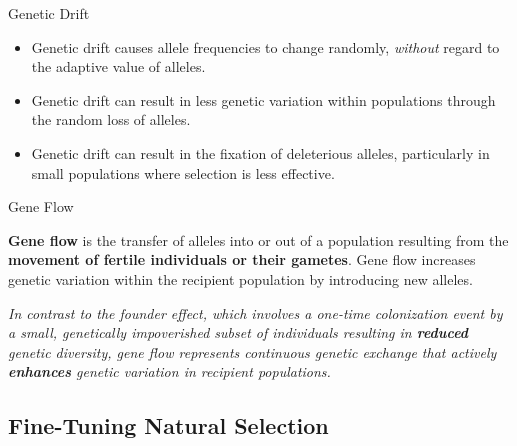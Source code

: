 \documentclass[10pt]{article}
\begin{document}
\begin{core}{Genetic Drift}
\begin{itemize}
        \item Genetic drift causes allele frequencies to change randomly, \textit{without} regard to the adaptive value of alleles.

        \item Genetic drift can result in less genetic variation within populations through the random loss of alleles.

        \item Genetic drift can result in the fixation of deleterious alleles, particularly in small populations where selection is less effective.

      \end{itemize}

    \end{core}

    \begin{core}{Gene Flow}

      \textbf{Gene flow} is the transfer of alleles into or out of a population resulting from the \textbf{movement of fertile individuals or their gametes}. Gene flow increases genetic variation within the recipient population by introducing new alleles.

      \textit{In contrast to the founder effect, which involves a one-time colonization event by a small, genetically impoverished subset of individuals resulting in \textbf{reduced} genetic diversity, gene flow represents continuous genetic exchange that actively \textbf{enhances} genetic variation in recipient populations.}

    \end{core}

  \subsection{Fine-Tuning Natural Selection}
\end{document}
